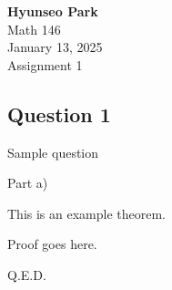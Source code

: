 \documentclass[10pt]{article}
\begin{document}
\begin{center}
    \textbf{Hyunseo Park} \\
    Math 146 \\
    January 13, 2025 \\
    Assignment 1
\end{center}


\begin{center} 
    \section*{Question 1}
\end{center}

\blueline

\vspace{0.3cm}

\begin{enumerate}[{$[$}1{$]$}]
    \item Sample question
    \begin{enumerate}[{$[$}a{$]$}]
        \item Part a)
    \end{enumerate}
\end{enumerate}

\blueline

\vspace{0.3cm}

\begin{center}
    \begin{theorem}
        This is an example theorem.
    \end{theorem}
\end{center}

\vspace{0.3cm}

\begin{proofb}
Proof goes here.
\end{proofb}

\vspace{0.3cm}
\begin{center}
    Q.E.D.
\end{center}
\end{document}
